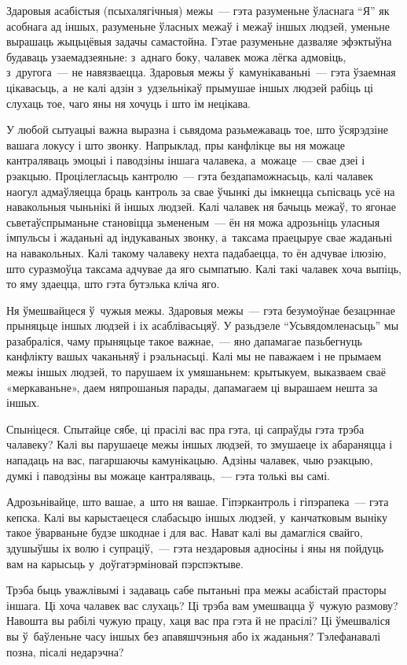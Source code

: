 Здаровыя асабістыя (псыхалягічныя) межы~--- гэта разуменьне ўласнага ``Я'' як асобнага ад іншых, разуменьне ўласных межаў і межаў іншых людзей, уменьне вырашаць жыцьцёвыя задачы самастойна. Гэтае разуменьне дазваляе эфэктыўна будаваць узаемадзеяньне: з~аднаго боку, чалавек можа лёгка адмовіць, з~другога~--- не навязваецца. Здаровыя межы ў~камунікаваньні~--- гэта ўзаемная цікавасьць, а~не калі адзін з~удзельнікаў прымушае іншых людзей рабіць ці слухаць тое, чаго яны ня хочуць і што ім нецікава.

У любой сытуацыі важна выразна і сьвядома разьмежаваць тое, што ўсярэдзіне вашага локусу і што звонку. Напрыклад, пры канфлікце вы ня можаце кантраляваць эмоцыі і паводзіны іншага чалавека, а~можаце~--- свае дзеі і рэакцыю. Процілегласьць кантролю~--- гэта бездапаможнасьць, калі чалавек наогул адмаўляецца браць кантроль за свае ўчынкі ды імкнецца сьпісваць усё на навакольныя чыньнікі й іншых людзей. Калі чалавек ня бачыць межаў, то ягонае сьветаўспрыманьне становіцца зьмененым~--- ён ня можа адрозьніць уласныя імпульсы і жаданьні ад індукаваных звонку, а~таксама праецыруе свае жаданьні на навакольных. Калі такому чалавеку нехта падабаецца, то ён адчувае ілюзію, што суразмоўца таксама адчувае да яго сымпатыю. Калі такі чалавек хоча выпіць, то яму здаецца, што гэта бутэлька кліча яго.

Ня ўмешвайцеся ў~чужыя межы. Здаровыя межы~--- гэта безумоўнае безацэннае прыняцьце іншых людзей і іх асаблівасьцяў. У разьдзеле ``Усьвядомленасьць'' мы разабраліся, чаму прыняцьце такое важнае,~--- яно дапамагае пазьбегнуць канфлікту вашых чаканьняў і рэальнасьці. Калі мы не паважаем і не прымаем межы іншых людзей, то парушаем іх умяшаньнем: крытыкуем, выказваем сваё «меркаваньне», даем няпрошаныя парады, дапамагаем ці вырашаем нешта за іншых. 

Спыніцеся. Спытайце сябе, ці прасілі вас пра гэта, ці сапраўды гэта трэба чалавеку? Калі вы парушаеце межы іншых людзей, то змушаеце іх абараняцца і нападаць на вас, пагаршаючы камунікацыю. Адзіны чалавек, чыю рэакцыю, думкі і паводзіны вы можаце кантраляваць,~--- гэта толькі вы самі.

Адрозьнівайце, што вашае, а~што ня вашае. Гіпэркантроль і гіпэрапека~--- гэта кепска. Калі вы карыстаецеся слабасьцю іншых людзей, у~канчатковым выніку такое ўварваньне будзе шкоднае і для вас. Нават калі вы дамагліся свайго, здушыўшы іх волю і супраціў,~--- гэта нездаровыя адносіны і яны ня пойдуць вам на карысьць у~доўгатэрміновай пэрспэктыве.

Трэба быць уважлівымі і задаваць сабе пытаньні пра межы асабістай прасторы іншага. Ці хоча чалавек вас слухаць? Ці трэба вам умешвацца ў~чужую размову? Навошта вы рабілі чужую працу, хаця вас пра гэта й не прасілі? Ці ўмешваліся вы ў~баўленьне часу іншых без апавяшчэньня або іх жаданьня? Тэлефанавалі позна, пісалі недарэчна?


